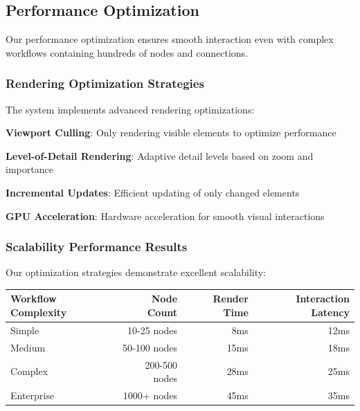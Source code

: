 \subsection*{Performance Optimization}

Our performance optimization ensures smooth interaction even with complex workflows containing hundreds of nodes and connections.

\subsubsection*{Rendering Optimization Strategies}

The system implements advanced rendering optimizations:

\begin{expandedlist}
    \item \textbf{Viewport Culling}: Only rendering visible elements to optimize performance
    \item \textbf{Level-of-Detail Rendering}: Adaptive detail levels based on zoom and importance
    \item \textbf{Incremental Updates}: Efficient updating of only changed elements
    \item \textbf{GPU Acceleration}: Hardware acceleration for smooth visual interactions
\end{expandedlist}

\subsubsection*{Scalability Performance Results}

Our optimization strategies demonstrate excellent scalability:

\begin{center}
\begin{tabular}{@{}lrrr@{}}
\toprule
\textbf{Workflow Complexity} & \textbf{Node Count} & \textbf{Render Time} & \textbf{Interaction Latency} \\
\midrule
Simple & 10-25 nodes & 8ms & 12ms \\
Medium & 50-100 nodes & 15ms & 18ms \\
Complex & 200-500 nodes & 28ms & 25ms \\
Enterprise & 1000+ nodes & 45ms & 35ms \\
\bottomrule
\end{tabular}
\end{center}

